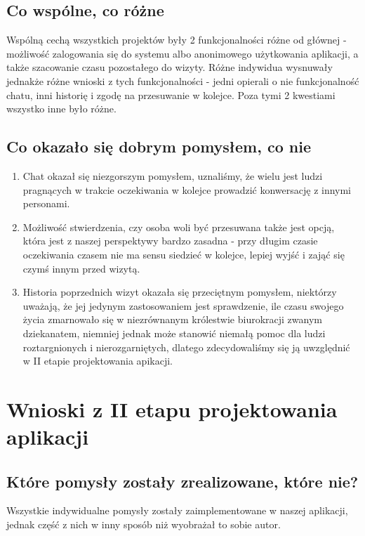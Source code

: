 \documentclass[12pt]{article}
\begin{document}
\subsection {Co wspólne, co różne}
Wspólną cechą wszystkich projektów były 2 funkcjonalności różne od głównej - możliwość zalogowania się do systemu albo anonimowego użytkowania aplikacji, a także szacowanie czasu pozostałego do wizyty. Różne indywidua wysnuwały jednakże różne wnioski z tych funkcjonalności - jedni opierali o nie funkcjonalność chatu, inni historię i zgodę na przesuwanie w kolejce. Poza tymi 2 kwestiami wszystko inne było różne.

\subsection{Co okazało się dobrym pomysłem, co nie}
\begin {enumerate}
	\item Chat okazał się niezgorszym pomysłem, uznaliśmy, że wielu jest ludzi pragnących w trakcie oczekiwania w kolejce prowadzić konwersację z innymi personami. 
	
	\item Możliwość stwierdzenia, czy osoba woli być przesuwana także jest opcją, która jest z naszej perspektywy bardzo zasadna - przy długim czasie oczekiwania czasem nie ma sensu siedzieć w kolejce, lepiej wyjść i zająć się czymś innym przed wizytą.
	
	\item Historia poprzednich wizyt okazała się przeciętnym pomysłem, niektórzy uważają, że jej jedynym zastosowaniem jest sprawdzenie, ile czasu swojego życia zmarnowało się w niezrównanym królestwie biurokracji zwanym dziekanatem, niemniej jednak może stanowić niemałą pomoc dla ludzi roztargnionych i nierozgarniętych, dlatego zdecydowaliśmy się ją uwzględnić w II etapie projektowania apikacji.
	
\end {enumerate}

\section {Wnioski z II etapu projektowania aplikacji}
\subsection {Które pomysły zostały zrealizowane, które nie?}

Wszystkie indywidualne pomysły zostały zaimplementowane w naszej aplikacji, jednak część z nich w inny sposób niż wyobrażał to sobie autor.
\end{document}
